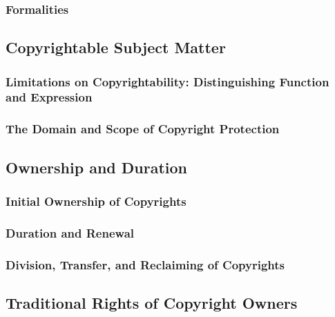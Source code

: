 \subsubsection{Formalities}


\subsection{Copyrightable Subject Matter}


\subsubsection{Limitations on Copyrightability: Distinguishing Function and 
Expression}


\subsubsection{The Domain and Scope of Copyright Protection}


\subsection{Ownership and Duration}


\subsubsection{Initial Ownership of Copyrights}


\subsubsection{Duration and Renewal}


\subsubsection{Division, Transfer, and Reclaiming of Copyrights}


\subsection{Traditional Rights of Copyright Owners}

